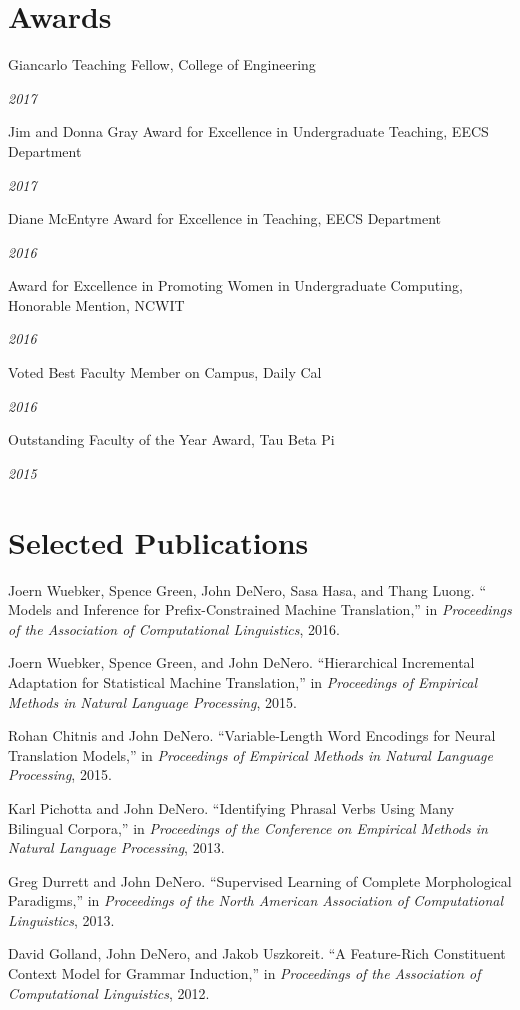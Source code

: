 \documentclass[margin,line]{res}
\newcommand{\dated}[2]{\parbox[t]{4.4in}{#1} \hspace{0.4in}
											 \parbox[t]{1in}{ {\it #2 } } }
\begin{document}
\begin{resume}
\section{\sc Awards}

\dated{Giancarlo Teaching Fellow, College of Engineering} { 2017 }

\dated{Jim and Donna Gray Award for Excellence in Undergraduate Teaching, EECS Department} { 2017 }

\dated{Diane McEntyre Award for Excellence in Teaching, EECS Department} { 2016 }

\dated{Award for Excellence in Promoting Women in Undergraduate Computing, Honorable Mention, NCWIT} { 2016 }

\dated{Voted Best Faculty Member on Campus, Daily Cal} { 2016 }

\dated{Outstanding Faculty of the Year Award, Tau Beta Pi} { 2015 }

\section{\sc Selected Publications}

\small

Joern Wuebker, Spence Green, John DeNero, Sasa Hasa, and Thang Luong. `` Models and Inference for Prefix-Constrained Machine Translation,'' in {\it Proceedings of the Association of Computational Linguistics}, 2016.

Joern Wuebker, Spence Green, and John DeNero. ``Hierarchical Incremental Adaptation for Statistical Machine Translation,'' in {\it Proceedings of Empirical Methods in Natural Language Processing}, 2015.

Rohan Chitnis and John DeNero. ``Variable-Length Word Encodings for Neural Translation Models,'' in {\it Proceedings of Empirical Methods in Natural Language Processing}, 2015.

Karl Pichotta and John DeNero.  ``Identifying Phrasal Verbs Using Many Bilingual Corpora,'' in {\it Proceedings of the Conference on Empirical Methods in Natural Language Processing}, 2013.

Greg Durrett and John DeNero.  ``Supervised Learning of Complete Morphological Paradigms,'' in {\it Proceedings of the North American Association of Computational Linguistics}, 2013.

David Golland, John DeNero, and Jakob Uszkoreit. ``A Feature-Rich Constituent Context Model for Grammar Induction,'' in {\it Proceedings of the Association of Computational Linguistics}, 2012.


\end{resume}
\end{document}
